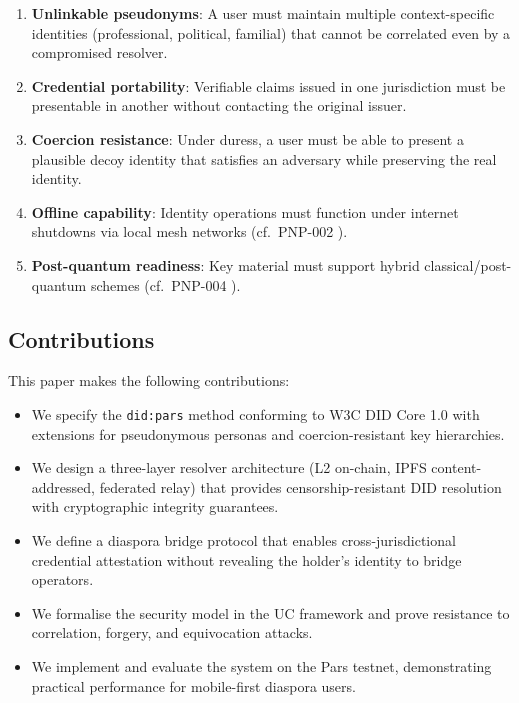 \documentclass[11pt,a4paper]{article}
\begin{document}
\begin{enumerate}[label=(\roman*)]
    \item \textbf{Unlinkable pseudonyms}: A user must maintain multiple context-specific
          identities (professional, political, familial) that cannot be correlated
          even by a compromised resolver.
    \item \textbf{Credential portability}: Verifiable claims issued in one jurisdiction
          must be presentable in another without contacting the original issuer.
    \item \textbf{Coercion resistance}: Under duress, a user must be able to present
          a plausible decoy identity that satisfies an adversary while preserving
          the real identity.
    \item \textbf{Offline capability}: Identity operations must function under
          internet shutdowns via local mesh networks (cf.\ PNP-002 \cite{pnp002}).
    \item \textbf{Post-quantum readiness}: Key material must support hybrid
          classical/post-quantum schemes (cf.\ PNP-004 \cite{pnp004}).
\end{enumerate}

\subsection{Contributions}

This paper makes the following contributions:

\begin{itemize}
    \item We specify the \texttt{did:pars} method conforming to W3C DID Core 1.0
          \cite{w3c-did-core} with extensions for pseudonymous personas and
          coercion-resistant key hierarchies.
    \item We design a three-layer resolver architecture (L2 on-chain, IPFS
          content-addressed, federated relay) that provides censorship-resistant
          DID resolution with cryptographic integrity guarantees.
    \item We define a diaspora bridge protocol that enables cross-jurisdictional
          credential attestation without revealing the holder's identity to bridge
          operators.
    \item We formalise the security model in the UC framework and prove resistance
          to correlation, forgery, and equivocation attacks.
    \item We implement and evaluate the system on the Pars testnet, demonstrating
          practical performance for mobile-first diaspora users.
\end{itemize}
\end{document}
